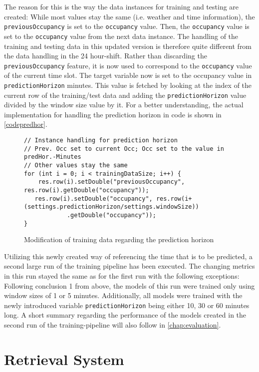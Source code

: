The reason for this is the way the data instances for training and testing are created: While most values stay the same (i.e. weather and time information), the \texttt{previousOccupancy} is set to the \texttt{occupancy} value. Then, the \texttt{occupancy} value is set to the \texttt{occupancy} value from the next data instance. The handling of the training and testing data in this updated version is therefore quite different from the data handling in the 24 hour-shift. Rather than discarding the \texttt{previousOccupancy} feature, it is now used to correspond to the \texttt{occupancy} value of the current time slot. The target variable now is set to the occupancy value in \texttt{predictionHorizon} minutes. This value is fetched by looking at the index of the current row of the training/test data and adding the \texttt{predictionHorizon} value divided by the window size value by it. For a better understanding, the actual implementation for handling the prediction horizon in code is shown in \autoref{codepredhor}.


\begin{figure}
\begin{lstlisting}
// Instance handling for prediction horizon
// Prev. Occ set to current Occ; Occ set to the value in predHor.-Minutes 
// Other values stay the same
for (int i = 0; i < trainingDataSize; i++) {
	res.row(i).setDouble("previousOccupancy", res.row(i).getDouble("occupancy"));
   res.row(i).setDouble("occupancy", res.row(i+(settings.predictionHorizon/settings.windowSize))
            .getDouble("occupancy"));
}
\end{lstlisting}
\caption{Modification of training data regarding the prediction horizon}
\label{codepredhor}
\end{figure}


Utilizing this newly created way of referencing the time that is to be predicted, a second large run of the training pipeline has been executed. The changing metrics in this run stayed the same as for the first run with the following exceptions: Following conclusion 1 from above, the models of this run were trained only using window sizes of 1 or 5 minutes. Additionally, all models were trained with the newly introduced variable \texttt{predictionHorizon} being either 10, 30 or 60 minutes long. A short summary regarding the performance of the models created in the second run of the training-pipeline will also follow in \autoref{chap:evaluation}.



\section{Retrieval System}
 
